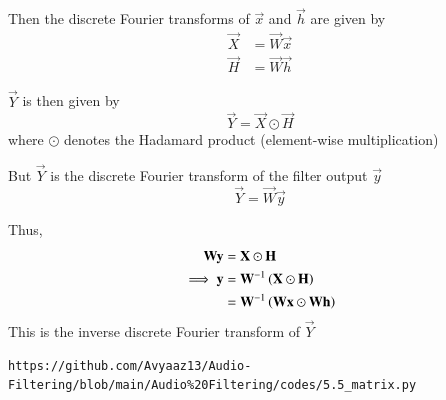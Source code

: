 \documentclass[journal,12pt,twocolumn]{IEEEtran}
\theoremstyle{remark}
\renewcommand\thesection{\arabic{section}}
\numberwithin{equation}{subsection}
\begin{document}
\begin{enumerate}[label=\thesection.\arabic*]
	Then the discrete Fourier transforms of $\vec{x}$ and $\vec{h}$ are given by
	\begin{align}
		\vec{X} &= \vec{W} \vec{x} \\
		\vec{H} &= \vec{W} \vec{h}
	\end{align}
	
	$\vec{Y}$ is then given by
	\begin{equation}
		\vec{Y} = \vec{X} \odot \vec{H}
	\end{equation}
	where $\odot$ denotes the Hadamard product (element-wise multiplication)
	
	But $\vec{Y}$ is the discrete Fourier transform of the filter output $\vec{y}$
	\begin{equation}
		\vec{Y} = \vec{W} \vec{y}
	\end{equation}
	
	Thus,
	\begin{align}
		\mathbf{W} \mathbf{y} &= \mathbf{X} \odot \mathbf{H} \\
		\implies \mathbf{y} &= \mathbf{W}^{-1} \left(\mathbf{X} \odot \mathbf{H}\right) \\
		&= \mathbf{W}^{-1} \left(\mathbf{W} \mathbf{x} \odot \mathbf{W} \mathbf{h}\right)
	\end{align}
	This is the inverse discrete Fourier transform of $\vec{Y}$
	



\begin{lstlisting}
https://github.com/Avyaaz13/Audio-Filtering/blob/main/Audio%20Filtering/codes/5.5_matrix.py
\end{lstlisting}


\end{enumerate}
\end{document}
